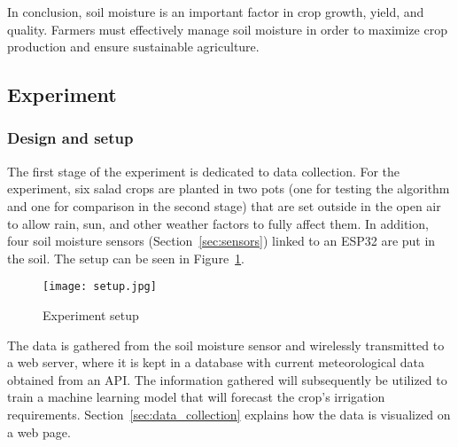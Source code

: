 \documentclass[11pt]{scrartcl} %
\begin{document}
\newline In conclusion, soil moisture is an important factor in crop growth, yield, and quality. Farmers must effectively manage soil moisture in order to maximize crop production and ensure sustainable agriculture.


\subsection{Experiment}
\subsubsection{Design and setup}
The first stage of the experiment is dedicated to data collection. For the experiment, six salad crops are planted in two pots (one for testing the algorithm and one for comparison in the second stage) that are set outside in the open air to allow rain, sun, and other weather factors to fully affect them. In addition, four soil moisture sensors (Section~\ref{sec:sensors}) linked to an ESP32 are put in the soil. The setup can be seen in Figure~\ref{fig:experiment_setup}.
\begin{figure}[h]
	\centering
	\texttt{[image: setup.jpg]}
	\caption{Experiment setup}
	\label{fig:experiment_setup}
\end{figure}
The data is gathered from the soil moisture sensor and wirelessly transmitted to a web server, where it is kept in a database with current meteorological data obtained from an API. The information gathered will subsequently be utilized to train a machine learning model that will forecast the crop's irrigation requirements. Section~\ref{sec:data_collection} explains how the data is visualized on a web page.
\end{document}

